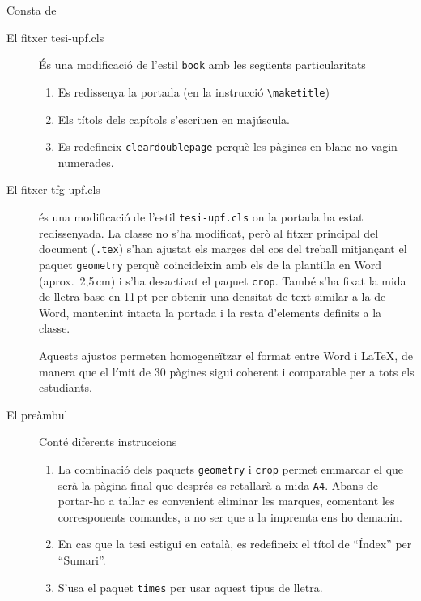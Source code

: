 \documentclass[11pt, a4paper,twoside]{tfg_dtic_upf}
\numberwithin{equation}{section}
\begin{document}
Consta de
\begin{description}
\item[El fitxer tesi-upf.cls] És una modificació de l'estil {\tt book} amb les següents particularitats
  \begin{enumerate}
  \item Es redissenya la portada (en la instrucció \verb+\maketitle+)

  \item Els títols dels capítols s'escriuen en majúscula.

  \item Es redefineix {\tt cleardoublepage} perquè les pàgines en blanc no vagin numerades.
  \end{enumerate}
\item[El fitxer tfg-upf.cls] és una modificació de l'estil \texttt{tesi-upf.cls} on la portada ha estat redissenyada. La classe no s'ha modificat, però al fitxer principal del document (\texttt{.tex}) s’han ajustat els marges del cos del treball mitjançant el paquet \texttt{geometry} perquè coincideixin amb els de la plantilla en Word (aprox.\ 2,5\,cm) i s’ha desactivat el paquet \texttt{crop}. També s’ha fixat la mida de lletra base en 11\,pt per obtenir una densitat de text similar a la de Word, mantenint intacta la portada i la resta d’elements definits a la classe.

Aquests ajustos permeten homogeneïtzar el format entre Word i \LaTeX{}, de manera que el límit de 30 pàgines sigui coherent i comparable per a tots els estudiants.



\item[El preàmbul] Conté diferents instruccions
  \begin{enumerate}
  \item La combinació dels paquets {\tt geometry} i {\tt crop} permet emmarcar el que serà la pàgina final que després es retallarà a mida {\tt A4}. Abans de portar-ho a tallar es convenient eliminar les marques, comentant les corresponents comandes, a no ser que a la impremta ens ho demanin.

  \item En cas que la tesi estigui en català, es redefineix el títol de ``Índex'' per ``Sumari''.

  \item S'usa el paquet {\tt times} per usar aquest tipus de lletra.


\end{enumerate}
\end{description}
\end{document}
